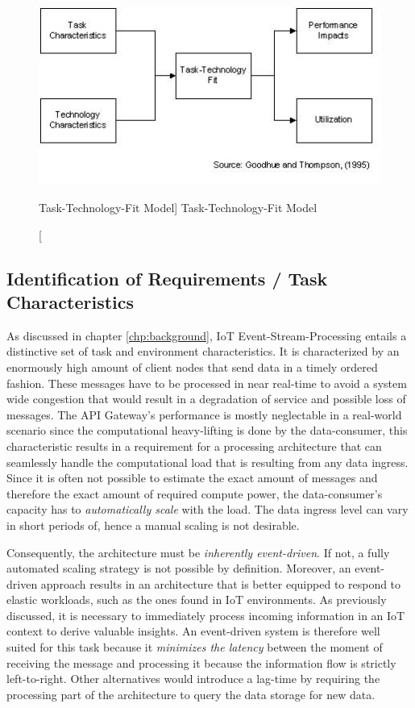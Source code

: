\begin{figure}[ht]
    \includegraphics[width=0.7\linewidth]{images/methodology/ttf.jpg}\centering
    \caption
    [Task-Technology-Fit Model]
    {Task-Technology-Fit Model \cite{Goodhue1995Task-TechnologyPerformance}}
\end{figure}

\subsection{Identification of Requirements / Task Characteristics}

As discussed in chapter \ref{chp:background}, IoT Event-Stream-Processing entails a distinctive set of task and environment characteristics. It is characterized by an enormously high amount of client nodes that send data in a timely ordered fashion. These messages have to be processed in near real-time to avoid a system wide congestion that would result in a degradation of service and possible loss of messages. The API Gateway's performance is mostly neglectable in a real-world scenario since the computational heavy-lifting is done by the data-consumer, this characteristic results in a requirement for a processing architecture that can seamlessly handle the computational load that is resulting from any data ingress.\\
Since it is often not possible to estimate the exact amount of messages and therefore the exact amount of required compute power, the data-consumer's capacity has to \textit{automatically scale} with the load. The data ingress level can vary in short periods of, hence a manual scaling is not desirable.

Consequently, the architecture must be \textit{inherently event-driven}. If not, a fully automated scaling strategy is not possible by definition. Moreover, an event-driven approach results in an architecture that is better equipped to respond to elastic workloads, such as the ones found in IoT environments. As previously discussed, it is necessary to immediately process incoming information in an IoT context to derive valuable insights. An event-driven system is therefore well suited for this task because it \textit{minimizes the latency} between the moment of receiving the message and processing it because the information flow is strictly left-to-right. Other alternatives would introduce a lag-time by requiring the processing part of the architecture to query the data storage for new data. 

